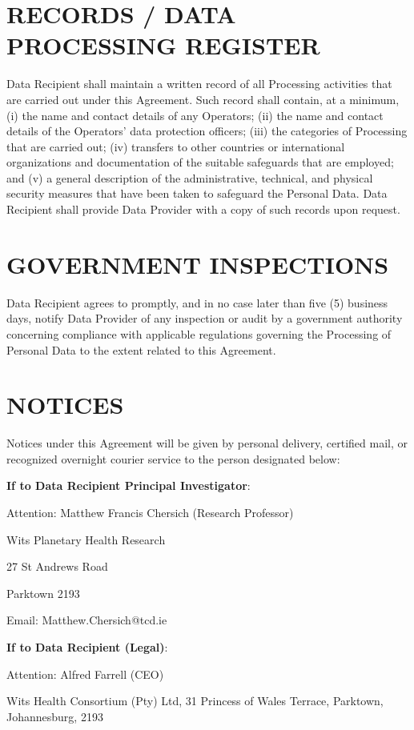 \documentclass[12pt,letterpaper]{article}
\begin{document}
\section{RECORDS / DATA PROCESSING REGISTER}

Data Recipient shall maintain a written record of all Processing activities that are carried out under this Agreement. Such record shall contain, at a minimum, (i) the name and contact details of any Operators; (ii) the name and contact details of the Operators' data protection officers; (iii) the categories of Processing that are carried out; (iv) transfers to other countries or international organizations and documentation of the suitable safeguards that are employed; and (v) a general description of the administrative, technical, and physical security measures that have been taken to safeguard the Personal Data. Data Recipient shall provide Data Provider with a copy of such records upon request.

\section{GOVERNMENT INSPECTIONS}

Data Recipient agrees to promptly, and in no case later than five (5) business days, notify Data Provider of any inspection or audit by a government authority concerning compliance with applicable regulations governing the Processing of Personal Data to the extent related to this Agreement.

\section{NOTICES}

Notices under this Agreement will be given by personal delivery, certified mail, or recognized overnight courier service to the person designated below:

\textbf{If to Data Recipient Principal Investigator}:

Attention: Matthew Francis Chersich (Research Professor)

Wits Planetary Health Research

27 St Andrews Road

Parktown 2193

Email: Matthew.Chersich@tcd.ie

\textbf{If to Data Recipient (Legal)}:

Attention: Alfred Farrell (CEO)

Wits Health Consortium (Pty) Ltd, 31 Princess of Wales Terrace, Parktown, Johannesburg, 2193
\end{document}
